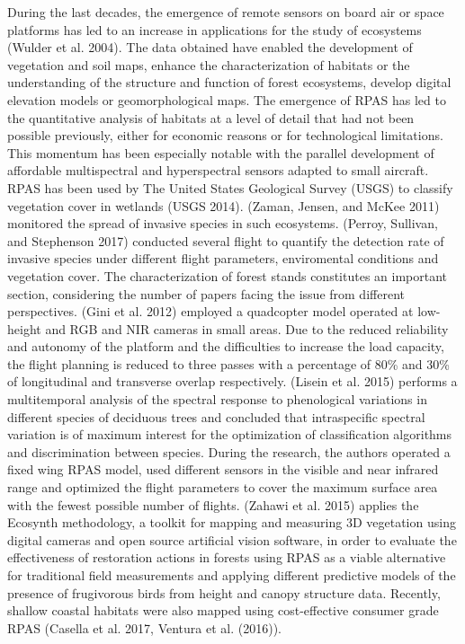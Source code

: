 \documentclass[]{interact}
\theoremstyle{plain}%
\theoremstyle{definition}
\theoremstyle{remark}
\begin{document}
During the last decades, the emergence of remote sensors on board air or
space platforms has led to an increase in applications for the study of
ecosystems (Wulder et al. 2004). The data obtained have enabled the
development of vegetation and soil maps, enhance the characterization of
habitats or the understanding of the structure and function of forest
ecosystems, develop digital elevation models or geomorphological maps.
The emergence of RPAS has led to the quantitative analysis of habitats
at a level of detail that had not been possible previously, either for
economic reasons or for technological limitations. This momentum has
been especially notable with the parallel development of affordable
multispectral and hyperspectral sensors adapted to small aircraft. RPAS
has been used by The United States Geological Survey (USGS) to classify
vegetation cover in wetlands (USGS 2014). (Zaman, Jensen, and McKee
2011) monitored the spread of invasive species in such ecosystems.
(Perroy, Sullivan, and Stephenson 2017) conducted several flight to
quantify the detection rate of invasive species under different flight
parameters, enviromental conditions and vegetation cover. The
characterization of forest stands constitutes an important section,
considering the number of papers facing the issue from different
perspectives. (Gini et al. 2012) employed a quadcopter model operated at
low-height and RGB and NIR cameras in small areas. Due to the reduced
reliability and autonomy of the platform and the difficulties to
increase the load capacity, the flight planning is reduced to three
passes with a percentage of 80\% and 30\% of longitudinal and transverse
overlap respectively. (Lisein et al. 2015) performs a multitemporal
analysis of the spectral response to phenological variations in
different species of deciduous trees and concluded that intraspecific
spectral variation is of maximum interest for the optimization of
classification algorithms and discrimination between species. During the
research, the authors operated a fixed wing RPAS model, used different
sensors in the visible and near infrared range and optimized the flight
parameters to cover the maximum surface area with the fewest possible
number of flights. (Zahawi et al. 2015) applies the Ecosynth
methodology, a toolkit for mapping and measuring 3D vegetation using
digital cameras and open source artificial vision software, in order to
evaluate the effectiveness of restoration actions in forests using RPAS
as a viable alternative for traditional field measurements and applying
different predictive models of the presence of frugivorous birds from
height and canopy structure data. Recently, shallow coastal habitats
were also mapped using cost-effective consumer grade RPAS (Casella et
al. 2017, Ventura et al. (2016)).
\end{document}
